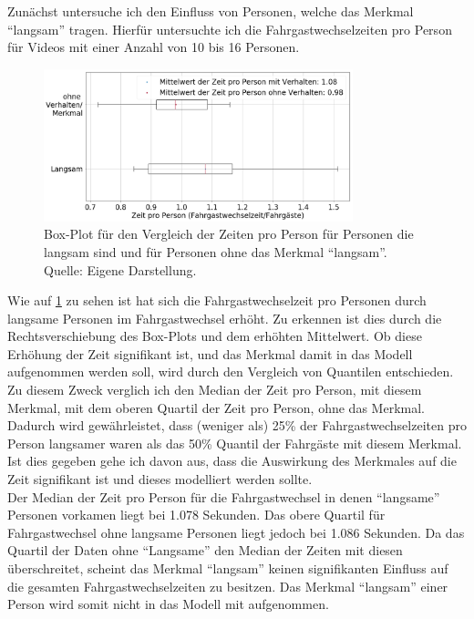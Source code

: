 Zunächst untersuche ich den Einfluss von Personen, welche das Merkmal "`langsam"' tragen. Hierfür untersuchte ich die Fahrgastwechselzeiten pro Person für Videos mit einer Anzahl von 10 bis 16 Personen.
\begin{figure}[H]
	\centering
		\includegraphics[width=0.8\textwidth]{pictures/data_evaluation/behavior/comp_Langsam.png}
	\caption{Box-Plot für den Vergleich der Zeiten pro Person für Personen die langsam sind und für Personen ohne das Merkmal "`langsam"'. Quelle: Eigene Darstellung.}
	\label{fig:BoxPlotLangsam}
\end{figure}
Wie auf \figurename \ref{fig:BoxPlotLangsam} zu sehen ist hat sich die Fahrgastwechselzeit pro Personen durch langsame Personen im Fahrgastwechsel erhöht. Zu erkennen ist dies durch die Rechtsverschiebung des Box-Plots und dem erhöhten Mittelwert. Ob diese Erhöhung der Zeit signifikant ist, und das Merkmal damit in das Modell aufgenommen werden soll, wird durch den Vergleich von Quantilen entschieden. Zu diesem Zweck verglich ich den Median der Zeit pro Person, mit diesem Merkmal, mit dem oberen Quartil der Zeit pro Person, ohne das Merkmal. Dadurch wird gewährleistet, dass (weniger als) 25\% der Fahrgastwechselzeiten pro Person langsamer waren als das 50\% Quantil der Fahrgäste mit diesem Merkmal. Ist dies gegeben gehe ich davon aus, dass die Auswirkung des Merkmales auf die Zeit signifikant ist und dieses modelliert werden sollte.\\
Der Median der Zeit pro Person für die Fahrgastwechsel in denen "`langsame"' Personen vorkamen liegt bei 1.078 Sekunden. Das obere Quartil für Fahrgastwechsel ohne langsame Personen liegt jedoch bei 1.086 Sekunden. Da das Quartil der Daten ohne "`Langsame"' den Median der Zeiten mit diesen überschreitet, scheint das Merkmal "`langsam"' keinen signifikanten Einfluss auf die gesamten Fahrgastwechselzeiten zu besitzen. Das Merkmal "`langsam"' einer Person wird somit nicht in das Modell mit aufgenommen.

